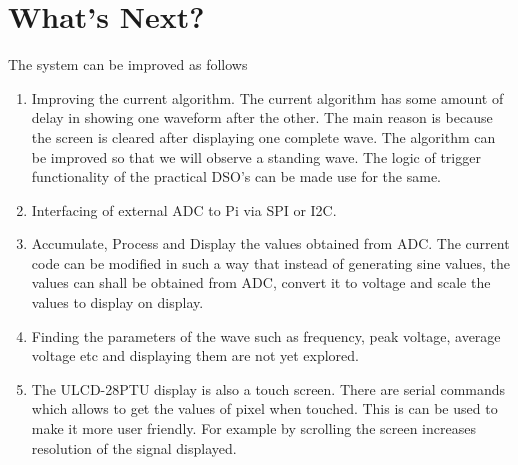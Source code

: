 \documentclass[12pt, a4paper, twoside]{article}
\begin{document}
\section{What's Next?}
	The system can be improved as follows
\begin{enumerate}
	\item Improving the current algorithm. The current algorithm has some amount of delay in showing one waveform after the other. The main reason is because the screen is cleared after displaying one complete wave. The algorithm can be improved so that we will observe a standing wave. The logic of trigger functionality of the practical DSO's can be made use for the same. 
	\item Interfacing of external ADC to Pi via SPI or I2C.
	\item Accumulate, Process and Display the values obtained from ADC. The current code can be modified in such a way that instead of generating sine values, the values can shall be obtained from ADC, convert it to voltage and scale the values to display on display.
	\item Finding the parameters of the wave such as frequency, peak voltage, average voltage etc and displaying them are not yet explored. 
	\item The ULCD-28PTU display is also a touch screen. There are serial commands which allows to get the values of pixel when touched. This is can be used to make it more user friendly. For example by scrolling the screen increases resolution of the signal displayed.
\end{enumerate}



 
\end{document}
